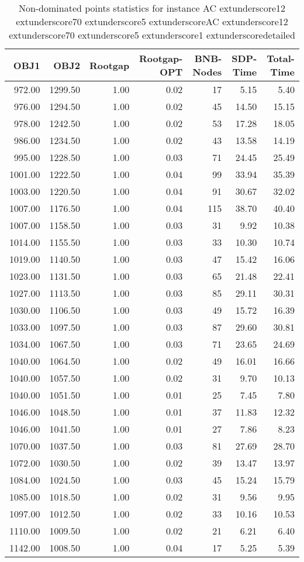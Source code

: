 \begin{table}
\caption{Non-dominated points statistics for instance AC	extunderscore12	extunderscore70	extunderscore5	extunderscoreAC	extunderscore12	extunderscore70	extunderscore5	extunderscore1	extunderscoredetailed}
\label{tab:stats/AC_12_70_5_AC_12_70_5_1_detailed}
\begin{tabular}{rrrrrrr}
\toprule
OBJ1 & OBJ2 & Rootgap & Rootgap-OPT & BNB-Nodes & SDP-Time & Total-Time \\
\midrule
972.00 & 1299.50 & 1.00 & 0.02 & 17 & 5.15 & 5.40 \\
976.00 & 1294.50 & 1.00 & 0.02 & 45 & 14.50 & 15.15 \\
978.00 & 1242.50 & 1.00 & 0.02 & 53 & 17.28 & 18.05 \\
986.00 & 1234.50 & 1.00 & 0.02 & 43 & 13.58 & 14.19 \\
995.00 & 1228.50 & 1.00 & 0.03 & 71 & 24.45 & 25.49 \\
1001.00 & 1222.50 & 1.00 & 0.04 & 99 & 33.94 & 35.39 \\
1003.00 & 1220.50 & 1.00 & 0.04 & 91 & 30.67 & 32.02 \\
1007.00 & 1176.50 & 1.00 & 0.04 & 115 & 38.70 & 40.40 \\
1007.00 & 1158.50 & 1.00 & 0.03 & 31 & 9.92 & 10.38 \\
1014.00 & 1155.50 & 1.00 & 0.03 & 33 & 10.30 & 10.74 \\
1019.00 & 1140.50 & 1.00 & 0.03 & 47 & 15.42 & 16.06 \\
1023.00 & 1131.50 & 1.00 & 0.03 & 65 & 21.48 & 22.41 \\
1027.00 & 1113.50 & 1.00 & 0.03 & 85 & 29.11 & 30.31 \\
1030.00 & 1106.50 & 1.00 & 0.03 & 49 & 15.72 & 16.39 \\
1033.00 & 1097.50 & 1.00 & 0.03 & 87 & 29.60 & 30.81 \\
1034.00 & 1067.50 & 1.00 & 0.03 & 71 & 23.65 & 24.69 \\
1040.00 & 1064.50 & 1.00 & 0.02 & 49 & 16.01 & 16.66 \\
1040.00 & 1057.50 & 1.00 & 0.02 & 31 & 9.70 & 10.13 \\
1040.00 & 1051.50 & 1.00 & 0.01 & 25 & 7.45 & 7.80 \\
1046.00 & 1048.50 & 1.00 & 0.01 & 37 & 11.83 & 12.32 \\
1046.00 & 1041.50 & 1.00 & 0.01 & 27 & 7.86 & 8.23 \\
1070.00 & 1037.50 & 1.00 & 0.03 & 81 & 27.69 & 28.70 \\
1072.00 & 1030.50 & 1.00 & 0.02 & 39 & 13.47 & 13.97 \\
1084.00 & 1024.50 & 1.00 & 0.03 & 45 & 15.24 & 15.79 \\
1085.00 & 1018.50 & 1.00 & 0.02 & 31 & 9.56 & 9.95 \\
1097.00 & 1012.50 & 1.00 & 0.02 & 33 & 10.16 & 10.53 \\
1110.00 & 1009.50 & 1.00 & 0.02 & 21 & 6.21 & 6.40 \\
1142.00 & 1008.50 & 1.00 & 0.04 & 17 & 5.25 & 5.39 \\
\bottomrule
\end{tabular}
\end{table}

